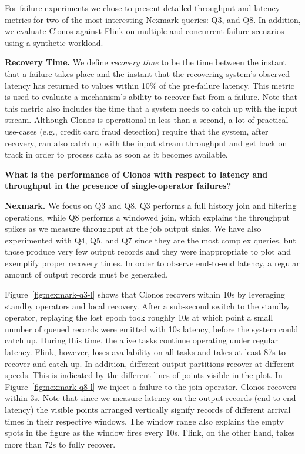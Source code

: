 \documentclass[sigconf]{acmart}
\newcommand{\para}[1]{\vspace{1mm}\noindent\textbf{#1.}}
\begin{document}
For failure experiments we chose to present detailed throughput and latency metrics for two of the most interesting Nexmark queries: Q3, and Q8. In addition, we evaluate Clonos against Flink on multiple and concurrent failure scenarios using a synthetic workload. 

\para{Recovery Time} We define \textit{recovery time} to be the time between the instant that a failure takes place and the instant that the recovering system's observed latency has returned to values within 10\% of the pre-failure latency. This metric is used to evaluate a mechanism's ability to recover fast from a failure. Note that this metric also includes the time that a system needs to catch up with the input stream. Although Clonos is operational in less than a second, a lot of practical use-cases (e.g., credit card fraud detection) require that the system, after recovery, can also catch up with the input stream throughput and get back on track in order to process data as soon as it becomes available.


\vspace{3mm}
\begin{myframe}
\textbf{What is the performance of Clonos with respect to latency and throughput in the presence of single-operator failures?}
\end{myframe}
\vspace{2mm}

\para{Nexmark}
We focus on Q3 and Q8. 
Q3 performs a full history join and filtering operations,  while Q8 performs a windowed join, which explains the throughput spikes as we measure throughput at the job output sinks.
We have also experimented with Q4, Q5, and Q7 since they are the most complex queries, but those produce very few output records and they were inappropriate to plot and exemplify proper recovery times. In order to observe end-to-end latency, a regular amount of output records must be generated.

Figure~\ref{fig:nexmark-q3-l} shows that Clonos recovers within 10s by leveraging standby operators and local recovery.
After a sub-second switch to the standby operator, replaying the lost epoch took roughly 10s at which point a small number of queued records were emitted with 10s latency, before the system could catch up.
During this time, the alive tasks continue operating under regular latency.
Flink, however, loses availability on all tasks and takes at least 87s to recover and catch up. In addition, different output partitions recover at different speeds. This is indicated by the different lines of points visible in the plot.
In Figure~\ref{fig:nexmark-q8-l} we inject a failure to the join operator. Clonos recovers within 3s. Note that since we measure latency on the output records (end-to-end latency) the visible points arranged vertically signify records of different arrival times in their respective windows. The window range also explains the empty spots in the figure as the window fires every 10s.
Flink, on the other hand, takes more than 72s to fully recover.
\end{document}
